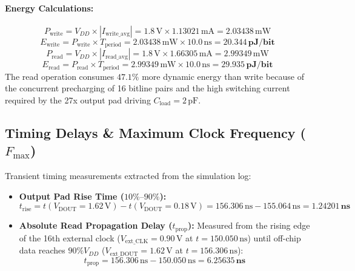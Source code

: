 \documentclass[10pt,a4paper,titlepage]{article}
\begin{document}
\paragraph{Energy Calculations:}
\begin{equation}
    P_{\text{write}} = V_{DD} \times |I_{\text{write\_avg}}| = 1.8\,\text{V} \times 1.13021\,\text{mA} = 2.03438\,\text{mW}
\end{equation}
\begin{equation}
    E_{\text{write}} = P_{\text{write}} \times T_{\text{period}} = 2.03438\,\text{mW} \times 10.0\,\text{ns} = \mathbf{20.344\,\text{pJ/bit}}
\end{equation}
\begin{equation}
    P_{\text{read}} = V_{DD} \times |I_{\text{read\_avg}}| = 1.8\,\text{V} \times 1.66305\,\text{mA} = 2.99349\,\text{mW}
\end{equation}
\begin{equation}
    E_{\text{read}} = P_{\text{read}} \times T_{\text{period}} = 2.99349\,\text{mW} \times 10.0\,\text{ns} = \mathbf{29.935\,\text{pJ/bit}}
\end{equation}
The read operation consumes $47.1\%$ more dynamic energy than write because of the concurrent precharging of 16 bitline pairs and the high switching current required by the 27x output pad driving $C_{\text{load}} = 2\,\text{pF}$.

\subsection{Timing Delays \& Maximum Clock Frequency ($F_{\text{max}}$)}
Transient timing measurements extracted from the simulation log:
\begin{itemize}[itemsep=2pt]
    \item \textbf{Output Pad Rise Time ($10\%\text{--}90\%$):}
      \begin{equation}
          t_{\text{rise}} = t(V_{\text{DOUT}} = 1.62\,\text{V}) - t(V_{\text{DOUT}} = 0.18\,\text{V}) = 156.306\,\text{ns} - 155.064\,\text{ns} = \mathbf{1.24201\,\text{ns}}
      \end{equation}
    \item \textbf{Absolute Read Propagation Delay ($t_{\text{prop}}$):}
      Measured from the rising edge of the 16th external clock ($V_{\text{ext\_CLK}} = 0.90\,\text{V}$ at $t = 150.050\,\text{ns}$) until off-chip data reaches $90\% V_{DD}$ ($V_{\text{ext\_DOUT}} = 1.62\,\text{V}$ at $t = 156.306\,\text{ns}$):
      \begin{equation}
          t_{\text{prop}} = 156.306\,\text{ns} - 150.050\,\text{ns} = \mathbf{6.25635\,\text{ns}}
      \end{equation}
\end{itemize}
\end{document}
